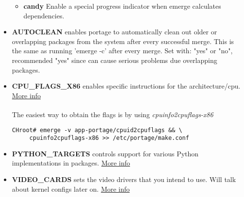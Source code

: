 \documentclass[10pt,a4paper]{article}
\begin{document}
\begin{itemize}
\begin{itemize}[label={o}]
                    \item \textbf{candy} Enable a special progress indicator when emerge calculates dependencies.
                    
                \end{itemize}
            
                \item \textbf{AUTOCLEAN} enables portage to automatically clean out older or overlapping packages from the system after every successful merge. This is the same as running 'emerge -c' after every merge. Set with: "yes" or "no", recommended "yes" since can cause serious problems due overlapping packages.
                

                
                \item \textbf{CPU\_FLAGS\_X86} enables specific instructions for the architecture/cpu. \href{https://wiki.gentoo.org/wiki/CPU_FLAGS_X86}{More info}
                


                    \paragraph{} The easiest way to obtain the flags is by using \textit{cpuinfo2cpuflags-x86}
     
\begin{lstlisting}[style=BashInputCHRoot]
 CHroot# emerge -v app-portage/cpuid2cpuflags && \
     cpuinfo2cpuflags-x86 >> /etc/portage/make.conf
\end{lstlisting}
                
                \item \textbf{PYTHON\_TARGETS} controls support for various Python implementations in packages. \href{https://wiki.gentoo.org/wiki/Project:Python/PYTHON_TARGETS}{More info}
                


                \item \textbf{VIDEO\_CARDS} sets the video drivers that you intend to use. Will talk about kernel configs later on. \href{https://wiki.gentoo.org/wiki/Xorg/Guide#make.conf}{More info}
                

\end{itemize}
\end{document}
